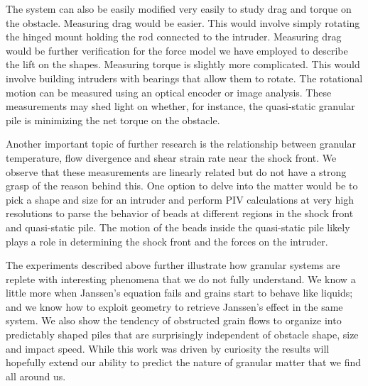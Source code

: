 The system can also be easily modified very easily to study drag and torque on the obstacle. Measuring drag would be easier. This would involve simply rotating the hinged mount holding the rod connected to the intruder. Measuring drag would be further verification for the force model we have employed to describe the lift on the shapes. Measuring torque is slightly more complicated. This would involve building intruders with bearings that allow them to rotate. The rotational motion can be measured using an optical encoder or image analysis. These measurements may shed light on whether, for instance, the quasi-static granular pile is minimizing the net torque on the obstacle. 

Another important topic of further research is the relationship between granular temperature, flow divergence and shear strain rate near the shock front. We observe that these measurements are linearly related but do not have a strong grasp of the reason behind this. One option to delve into the matter would be to pick a shape and size for an intruder and perform PIV calculations at very high resolutions to parse the behavior of beads at different regions in the shock front and quasi-static pile. The motion of the beads inside the quasi-static pile likely plays a role in determining the shock front and the forces on the intruder. 


The experiments described above further illustrate how granular systems are replete with interesting phenomena that we do not fully understand. We know a little more when Janssen's equation fails and grains start to behave like liquids; and we know how to exploit geometry to retrieve Janssen's effect in the same system. We also show the tendency of obstructed grain flows to organize into predictably shaped piles that are surprisingly independent of obstacle shape, size and impact speed. While this work was driven by curiosity the results will hopefully extend our ability to predict the nature of granular matter that we find all around us. 